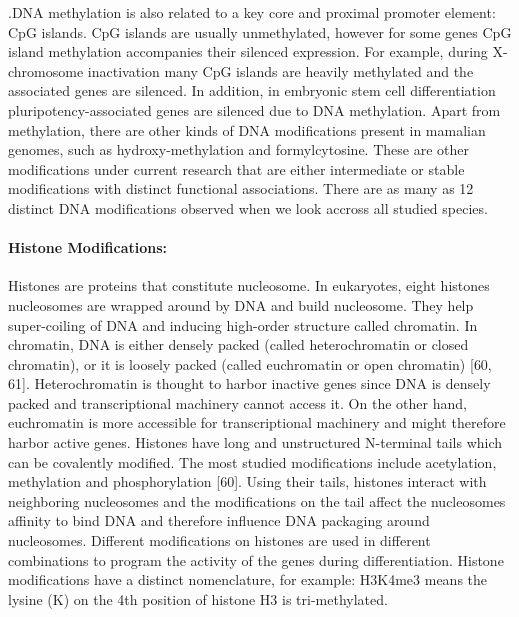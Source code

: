 \documentclass[12pt,]{krantz}
\let\oldparagraph\paragraph
\renewcommand{\paragraph}[1]{\oldparagraph{#1}\mbox{}}
\begin{document}
.DNA methylation is also related to a
key core and proximal promoter element: CpG islands. CpG islands are usually
unmethylated, however for some genes CpG island methylation accompanies their
silenced expression. For example, during X-chromosome inactivation many CpG
islands are heavily methylated and the associated genes are silenced. In
addition, in embryonic stem cell differentiation pluripotency-associated genes
are silenced due to DNA methylation. Apart from methylation, there are other
kinds of DNA modifications present in mamalian genomes, such as hydroxy-methylation and
formylcytosine. These are other modifications under current research that are either
intermediate or stable modifications with distinct functional associations. There
are as many as 12 distinct DNA modifications observed when we look accross
all studied species.

\hypertarget{histone-modifications}{%
\paragraph{Histone Modifications:}\label{histone-modifications}}

Histones are proteins that constitute nucleosome. In
eukaryotes, eight histones nucleosomes are wrapped around by DNA and build
nucleosome. They help super-coiling of DNA and inducing high-order structure
called chromatin. In chromatin, DNA is either densely packed (called
heterochromatin or closed chromatin), or it is loosely packed (called
euchromatin or open chromatin) {[}60, 61{]}. Heterochromatin is thought to harbor
inactive genes since DNA is densely packed and transcriptional machinery cannot
access it. On the other hand, euchromatin is more accessible for transcriptional
machinery and might therefore harbor active genes. Histones have long and
unstructured N-terminal tails which can be covalently modified. The most studied
modifications include acetylation, methylation and phosphorylation {[}60{]}. Using
their tails, histones interact with neighboring nucleosomes and the
modifications on the tail affect the nucleosomes affinity to bind DNA and
therefore influence DNA packaging around nucleosomes. Different modifications on
histones are used in different combinations to program the activity of the genes
during differentiation. Histone modifications have a distinct nomenclature, for
example: H3K4me3 means the lysine (K) on the 4th position of histone H3 is
tri-methylated.
\end{document}
